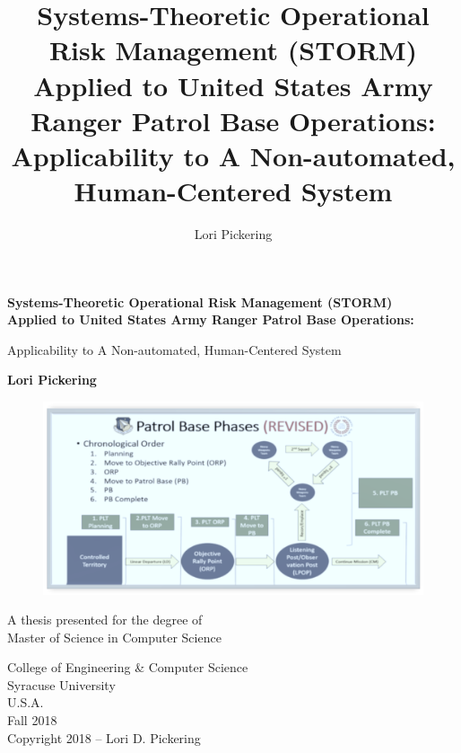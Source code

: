 \documentclass[hidelinks,12pt,a4paper]{report}
\begin{document}
\lstset{language=ML, basicstyle=\scriptsize}
\title{Systems-Theoretic Operational Risk Management (STORM) \\Applied to United States Army Ranger Patrol Base Operations: \\Applicability to A Non-automated, Human-Centered System}
\author{Lori Pickering}

\begin{titlepage}
\begin{center}
        \vspace*{1cm}
        
        \textbf{Systems-Theoretic Operational Risk Management (STORM) \\
                   Applied to United States Army Ranger Patrol Base Operations: \\
                   }
        
        \vspace{0.5cm}
        Applicability to A Non-automated, Human-Centered System
        
        \vspace{1.5cm}
        
        \textbf{Lori Pickering}
 \begin{figure}[t]
\includegraphics[width=\textwidth]{../figures/pbtoplevel2}
\end{figure}
       
        \vfill
        
        A thesis presented for the degree of\\
        Master of Science in Computer Science
        
        \vspace{0.8cm}
        
        
        College of Engineering \& Computer Science\\
        Syracuse University\\
        U.S.A.\\
        Fall 2018\\
       \textcopyright  Copyright 2018 -- Lori D. Pickering
    \end{center}



\end{titlepage}
\end{document}
